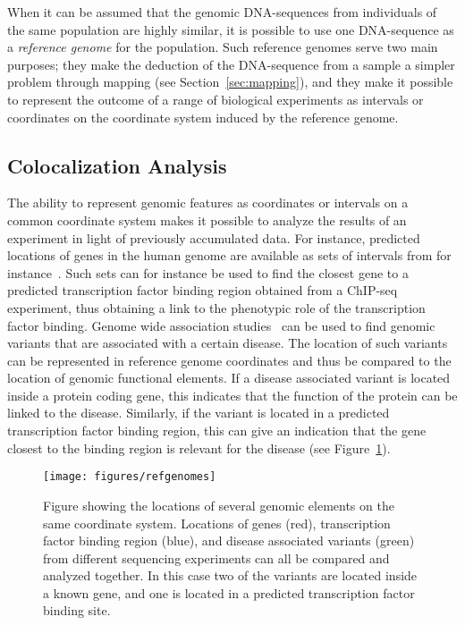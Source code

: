 When it can be assumed that the genomic DNA-sequences from individuals of the same population are highly similar, it is possible to use one DNA-sequence as a \emph{reference genome} for the population.
Such reference genomes serve two main purposes;
they make the deduction of the DNA-sequence from a sample a simpler problem through mapping (see Section~\ref{sec:mapping}), and they make it possible to represent the outcome of a range of biological experiments as intervals or coordinates on the coordinate system induced by the reference genome. 

\subsection{Colocalization Analysis}
The ability to represent genomic features as coordinates or intervals on a common coordinate system makes it possible to analyze the results of an experiment in light of previously accumulated data.
For instance, predicted locations of genes in the human genome are available as sets of intervals from for instance~\cite{genelist}.
Such sets can for instance be used to find the closest gene to a predicted transcription factor binding region obtained from a ChIP-seq experiment, thus obtaining a link to the phenotypic role of the transcription factor binding.
Genome wide association studies~\cite{gwas} can be used to find genomic variants that are associated with a certain disease.
The location of such variants can be represented in reference genome coordinates and thus be compared to the location of genomic functional elements.
If a disease associated variant is located inside a protein coding gene, this indicates that the function of the protein can be linked to the disease.
Similarly, if the variant is located in a predicted transcription factor binding region, this can give an indication that the gene closest to the binding region is relevant for the disease (see Figure~\ref{fig:refpos}).
\begin{figure}
  \texttt{[image: figures/refgenomes]}
  \caption{Figure showing the locations of several genomic elements on the same coordinate system.
    Locations of genes (red), transcription factor binding region (blue), and disease associated variants (green) from different sequencing experiments can all be compared and analyzed together.
    In this case two of the variants are located inside a known gene, and one is located in a predicted transcription factor binding site.
  }
  \label{fig:refpos}

\end{figure}

